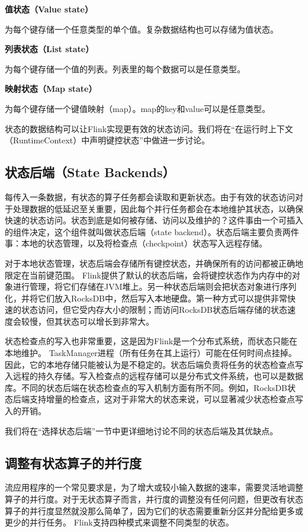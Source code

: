 \documentclass[oneside]{ctexbook}
\begin{document}
\textbf{值状态（Value state）}

为每个键存储一个任意类型的单个值。复杂数据结构也可以存储为值状态。

\textbf{列表状态（List state）}

为每个键存储一个值的列表。列表里的每个数据可以是任意类型。

\textbf{映射状态（Map state）}

为每个键存储一个键值映射（map）。map的key和value可以是任意类型。

状态的数据结构可以让Flink实现更有效的状态访问。我们将在“在运行时上下文（RuntimeContext）中声明键控状态”中做进一步讨论。

\subsection{状态后端（State Backends）}

每传入一条数据，有状态的算子任务都会读取和更新状态。由于有效的状态访问对于处理数据的低延迟至关重要，因此每个并行任务都会在本地维护其状态，以确保快速的状态访问。状态到底是如何被存储、访问以及维护的？这件事由一个可插入的组件决定，这个组件就叫做状态后端（state backend）。状态后端主要负责两件事：本地的状态管理，以及将检查点（checkpoint）状态写入远程存储。

对于本地状态管理，状态后端会存储所有键控状态，并确保所有的访问都被正确地限定在当前键范围。 Flink提供了默认的状态后端，会将键控状态作为内存中的对象进行管理，将它们存储在JVM堆上。另一种状态后端则会把状态对象进行序列化，并将它们放入RocksDB中，然后写入本地硬盘。第一种方式可以提供非常快速的状态访问，但它受内存大小的限制；而访问RocksDB状态后端存储的状态速度会较慢，但其状态可以增长到非常大。

状态检查点的写入也非常重要，这是因为Flink是一个分布式系统，而状态只能在本地维护。 TaskManager进程（所有任务在其上运行）可能在任何时间点挂掉。因此，它的本地存储只能被认为是不稳定的。状态后端负责将任务的状态检查点写入远程的持久存储。写入检查点的远程存储可以是分布式文件系统，也可以是数据库。不同的状态后端在状态检查点的写入机制方面有所不同。例如，RocksDB状态后端支持增量的检查点，这对于非常大的状态来说，可以显著减少状态检查点写入的开销。

我们将在“选择状态后端”一节中更详细地讨论不同的状态后端及其优缺点。

\subsection{调整有状态算子的并行度}

流应用程序的一个常见要求是，为了增大或较小输入数据的速率，需要灵活地调整算子的并行度。对于无状态算子而言，并行度的调整没有任何问题，但更改有状态算子的并行度显然就没那么简单了，因为它们的状态需要重新分区并分配给更多或更少的并行任务。 Flink支持四种模式来调整不同类型的状态。
\end{document}
